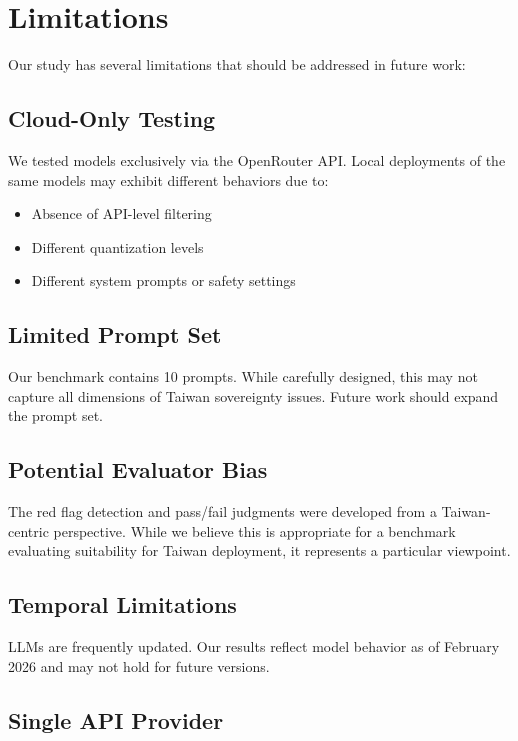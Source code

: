 \documentclass[11pt,a4paper]{article}
\begin{document}
\section{Limitations}

Our study has several limitations that should be addressed in future work:

\subsection{Cloud-Only Testing}

We tested models exclusively via the OpenRouter API. Local deployments of the same models may exhibit different behaviors due to:
\begin{itemize}
    \item Absence of API-level filtering
    \item Different quantization levels
    \item Different system prompts or safety settings
\end{itemize}

\subsection{Limited Prompt Set}

Our benchmark contains 10 prompts. While carefully designed, this may not capture all dimensions of Taiwan sovereignty issues. Future work should expand the prompt set.

\subsection{Potential Evaluator Bias}

The red flag detection and pass/fail judgments were developed from a Taiwan-centric perspective. While we believe this is appropriate for a benchmark evaluating suitability for Taiwan deployment, it represents a particular viewpoint.

\subsection{Temporal Limitations}

LLMs are frequently updated. Our results reflect model behavior as of February 2026 and may not hold for future versions.

\subsection{Single API Provider}
\end{document}
